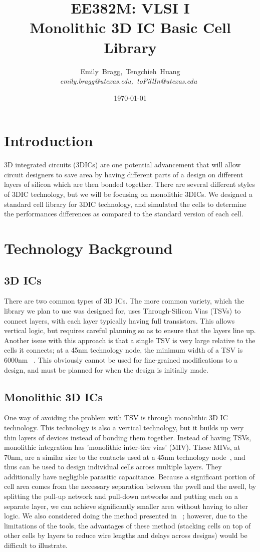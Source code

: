 \documentclass{article}
\title{EE382M: VLSI I \\ Monolithic 3D IC Basic Cell Library}
\author {
	Emily~Bragg,~Tengchieh~Huang\\
       	\em emily.bragg@utexas.edu,~toFillIn@utexas.edu\
}
\date{\today}
\begin{document}
\maketitle


\newpage
\section{Introduction}
3D integrated circuits (3DICs) are one potential advancement that will allow circuit designers to save area by having different parts of a design on different layers of silicon which are then bonded together. There are several different styles of 3DIC technology, but we will be focusing on monolithic 3DICs. We designed a standard cell library for 3DIC technology, and simulated the cells to determine the performances differences as compared to the standard version of each cell. 
\section{Technology Background}
\subsection{3D ICs} There are two common types of 3D ICs. The more common variety, which the library we plan to use was designed for, uses Through-Silicon Vias (TSVs) to connect layers, with each layer typically having full transistors. This allows vertical logic, but requires careful planning so as to ensure that the layers line up. Another issue with this approach is that a single TSV is very large relative to the cells it connects; at a 45nm technology node, the minimum width of a TSV is 6000nm ~\cite{NCSU}. This obviously cannot be used for fine-grained modifications to a design, and must be planned for when the design is initially made. 
\subsection{Monolithic 3D ICs} One way of avoiding the problem with TSV is through monolithic 3D IC technology. This technology is also a vertical technology, but it builds up very thin layers of devices instead of bonding them together. Instead of having TSVs, monolithic integration has 'monolithic inter-tier vias' (MIV). These MIVs, at 70nm, are a similar size to the contacts used at a 45nm technology node~\cite{ULTRA}, and thus can be used to design individual cells across multiple layers. They additionally have negligible parasitic capacitance. Because a significant portion of cell area comes from the necessary separation between the pwell and the nwell, by splitting the pull-up network and pull-down networks and putting each on a separate layer, we can achieve significantly smaller area without having to alter logic. We also considered doing the method presented in ~\cite{CELONCEL}; however, due to the limitations of the tools, the advantages of these method (stacking cells on top of other cells by layers to reduce wire lengths and delays across designs) would be difficult to illustrate.
\end{document}
